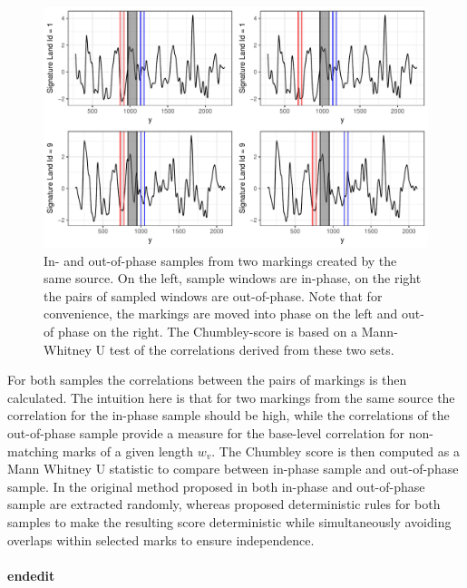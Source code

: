 \documentclass[12pt]{article}
\begin{document}
\begin{figure}

{\centering \includegraphics[width=\textwidth]{figures/win-comparison-1} 

}

\caption{In- and out-of-phase samples from two markings created by the same source. On the left, sample windows are in-phase, on the right the pairs of sampled windows are out-of-phase. Note that for convenience, the markings are moved into phase on the left and out-of phase on the right. The Chumbley-score is based on a Mann-Whitney U test of the correlations derived from these two sets.}\label{fig:win-comparison}
\end{figure}

For both samples the correlations between the pairs of markings is then
calculated. The intuition here is that for two markings from the same
source the correlation for the in-phase sample should be high, while the
correlations of the out-of-phase sample provide a measure for the
base-level correlation for non-matching marks of a given length \(w_v\).
The Chumbley score is then computed as a Mann Whitney U statistic to
compare between in-phase sample and out-of-phase sample. In the original
method proposed in \citet{chumbley} both in-phase and out-of-phase
sample are extracted randomly, whereas \citet{hadler} proposed
deterministic rules for both samples to make the resulting score
deterministic while simultaneously avoiding overlaps within selected
marks to ensure independence.

\paragraph{endedit}\label{endedit}
\end{document}
